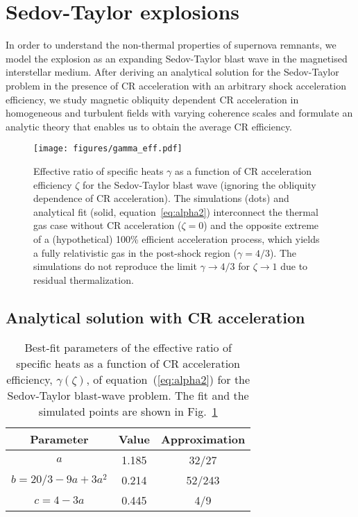 \documentclass[8pt,a4paper,usenatbib]{mnras}
\begin{document}
\section{Sedov-Taylor explosions}
\label{sec:sedov}

In order to understand the non-thermal properties of supernova remnants, we
model the explosion as an expanding Sedov-Taylor blast wave in the magnetised
interstellar medium.  After deriving an analytical solution for the Sedov-Taylor
problem in the presence of CR acceleration with an arbitrary shock acceleration
efficiency, we study magnetic obliquity dependent CR acceleration in homogeneous
and turbulent fields with varying coherence scales and formulate an analytic
theory that enables us to obtain the average CR efficiency.

\begin{figure}
\centering
\texttt{[image: figures/gamma\_eff.pdf]} 
\caption{Effective ratio of specific heats $\gamma$ as a function of CR
  acceleration efficiency $\zeta$ for the Sedov-Taylor blast wave (ignoring the
  obliquity dependence of CR acceleration). The simulations (dots) and
  analytical fit (solid, equation~\ref{eq:alpha2}) interconnect the thermal gas
  case without CR acceleration (${\zeta=0}$) and the opposite extreme of a
  (hypothetical) 100\% efficient acceleration process, which yields a fully
  relativistic gas in the post-shock region ($\gamma=4/3$). The simulations do
  not reproduce the limit $\gamma\to4/3$ for $\zeta\to1$ due to residual
  thermalization.}
\label{fig4:mach}
\end{figure} 


\subsection{Analytical solution with CR acceleration}
\label{sec:analytics}

\begin{table}
 \begin{center}
\begin{tabular}{c|c|c}
 \textbf{Parameter} & \textbf{Value} & \textbf{Approximation} \\ 
 \hline
 $a$ & 1.185 & 32/27\\
$b = 20/3 - 9a + 3 a^2 $ & 0.214 & 52/243 \\ 
$c = 4-3a$ & 0.445 & 4/9\\ 
\end{tabular}
\end{center}
 \caption{Best-fit parameters of the effective ratio of specific heats as a
   function of CR acceleration efficiency, $\gamma(\zeta)$, of
   equation~(\ref{eq:alpha2}) for the Sedov-Taylor blast-wave problem. The fit and the
   simulated points are shown in Fig.~\ref{fig4:mach}}
    \label{tab:2}
\end{table}
\end{document}
